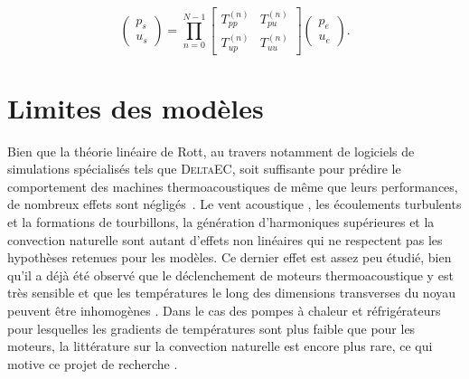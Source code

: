 \begin{equation}
\begin{pmatrix}
p_s\\
u_s
\end{pmatrix} = \prod_{n=0}^{N-1} \begin{bmatrix}
T_{pp}^{(n)} & T_{pu}^{(n)}\\
T_{up}^{(n)} & T_{uu}^{(n)}
\end{bmatrix}\begin{pmatrix}
p_e\\
u_e
\end{pmatrix}.
\label{eq:TMatrix_prod_TppTuu}
\end{equation}

\section{Limites des modèles}


Bien que la théorie linéaire de Rott, au travers notamment de logiciels de simulations spécialisés tels que \textsc{DeltaEC}, soit suffisante pour prédire le comportement des machines thermoacoustiques de même que leurs performances, de nombreux effets sont négligés~\cite{DeltaEC}. Le vent acoustique \cite{so_internal_2006, bailliet_acoustic_2001, ramadan_experimental_2018}, les écoulements turbulents et la formations de tourbillons, la génération d'harmoniques supérieures et la convection naturelle sont autant d'effets non linéaires qui ne respectent pas les hypothèses retenues pour les modèles. Ce dernier effet est assez peu étudié, bien qu'il a déjà été observé que le déclenchement de moteurs thermoacoustique y est très sensible et que les températures le long des dimensions transverses du noyau peuvent être inhomogènes \cite{ross_influence_2003, ramadan_experimental_2018, hireche_numerical_2019}. Dans le cas des pompes à chaleur et réfrigérateurs pour lesquelles les gradients de températures sont plus faible que pour les moteurs, la littérature sur la convection naturelle est encore plus rare, ce qui motive ce projet de recherche \cite{zhang_novel_2011, babaei_investigation_2010}.

